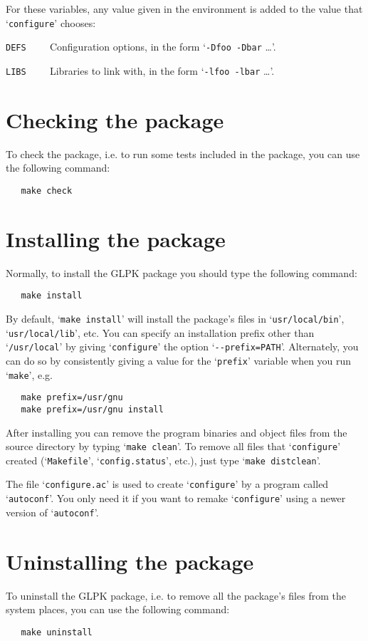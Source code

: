 For these variables, any value given in the environment is added to the
value that `\verb|configure|' chooses:

\verb|DEFS    | Configuration options, in the form
`\verb|-Dfoo -Dbar| \dots'.

\verb|LIBS    | Libraries to link with, in the form
`\verb|-lfoo -lbar| \dots'.

\section{Checking the package}

To check the package, i.e. to run some tests included in the package,
you can use the following command:

\begin{verbatim}
   make check
\end{verbatim}

\section{Installing the package}

Normally, to install the GLPK package you should type the following
command:

\begin{verbatim}
   make install
\end{verbatim}

\noindent
By default, `\verb|make install|' will install the package's files in
`\verb|usr/local/bin|', `\verb|usr/local/lib|', etc. You can specify an
installation prefix other than `\verb|/usr/local|' by giving
`\verb|configure|' the option `\verb|--prefix=PATH|'. Alternately, you
can do so by consistently giving a value for the `\verb|prefix|'
variable when you run `\verb|make|', e.g.

\begin{verbatim}
   make prefix=/usr/gnu
   make prefix=/usr/gnu install
\end{verbatim}

After installing you can remove the program binaries and object files
from the source directory by typing `\verb|make clean|'. To remove all
files that `\verb|configure|' created (`\verb|Makefile|',
`\verb|config.status|', etc.), just type `\verb|make distclean|'.

The file `\verb|configure.ac|' is used to create `\verb|configure|' by
a program called `\verb|autoconf|'. You only need it if you want to
remake `\verb|configure|' using a newer version of `\verb|autoconf|'.

\section{Uninstalling the package}

To uninstall the GLPK package, i.e. to remove all the package's files
from the system places, you can use the following command:

\begin{verbatim}
   make uninstall
\end{verbatim}


